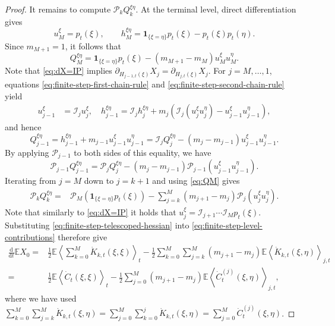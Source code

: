 \documentclass[11pt]{article}
\numberwithin{equation}{section}
\newcommand{\E}{\mathbb{E}}
\newcommand{\1}{\mathbf 1}
\begin{document}
\begin{proof}
It remains to compute $\mathcal P_kQ_k^{\xi\eta}$.  At the terminal
level, direct differentiation gives
\[
u_M^\xi=p_t(\xi),\qquad
h_M^{\xi\eta}
=\mathbf 1_{\{\xi=\eta\}}p_t(\xi)-p_t(\xi)p_t(\eta).
\]
Since $m_{M+1}=1$, it follows that
\begin{equation}\label{eq:QM}
Q_M^{\xi\eta}
=\mathbf 1_{\{\xi=\eta\}}p_t(\xi)
-(m_{M+1}-m_M)u_M^\xi u_M^\eta.
\end{equation}
Note that \eqref{eq:dX=IP} implies $\partial_{H_{j-1,t}(\xi)}X_j = \partial_{H_{j,t}(\xi)}X_j$.
For $j=M,\ldots,1$, equations
\eqref{eq:finite-step-first-chain-rule} and
\eqref{eq:finite-step-second-chain-rule} yield
\begin{align*}
u_{j-1}^\xi
&=\mathcal I_ju_j^\xi, \quad 
h_{j-1}^{\xi\eta}
=\mathcal I_jh_j^{\xi\eta}
+m_j\left(
\mathcal I_j(u_j^\xi u_j^\eta)
-u_{j-1}^\xi u_{j-1}^\eta
\right),
\end{align*}
and hence
\[
Q_{j-1}^{\xi\eta}=h_{j-1}^{\xi\eta}+m_{j-1}u_{j-1}^\xi u_{j-1}^\eta
=\mathcal I_jQ_j^{\xi\eta}
-(m_j-m_{j-1})u_{j-1}^\xi u_{j-1}^\eta.
\]
By applying $\mathcal P_{j-1}$ to both sides of this equality, we have
\[
\mathcal P_{j-1}Q_{j-1}^{\xi\eta}
=\mathcal P_jQ_j^{\xi\eta}
-(m_j-m_{j-1})
\mathcal P_{j-1}(u_{j-1}^\xi u_{j-1}^\eta).
\]
Iterating from $j=M$ down to $j=k+1$ and using \eqref{eq:QM}
gives
\begin{align}
\mathcal P_kQ_k^{\xi\eta}
={}&\mathcal P_M
\left(\mathbf 1_{\{\xi=\eta\}}p_t(\xi)\right)
-\sum_{j=k}^M(m_{j+1}-m_j)
\mathcal P_j(u_j^\xi u_j^\eta).
\label{eq:finite-step-telescoped-hessian}
\end{align}
Note that similarly to \eqref{eq:dX=IP} it holds that $u_j^\xi =\mathcal I_{j+1}\cdots\mathcal I_Mp_t(\xi)$.
Substituting \eqref{eq:finite-step-telescoped-hessian} into
\eqref{eq:finite-step-level-contributions} therefore give
\begin{align*}
   \frac{\mathrm d}{\mathrm dt}\E X_0 
={}&\frac12\E\left\langle
\sum_{k=0}^M\dot K_{k,t}(\xi,\xi)
\right\rangle_t-\frac12\sum_{k=0}^M\sum_{j=k}^M(m_{j+1}-m_j)
\E\left\langle
\dot K_{k,t}(\xi,\eta)
\right\rangle_{j,t}\\
={}&\frac12\E\left\langle
\dot C_t(\xi,\xi)
\right\rangle_t
-\frac12\sum_{j=0}^M(m_{j+1}-m_j)
\E\left\langle
\dot C_t^{(j)}(\xi,\eta)
\right\rangle_{j,t},
\end{align*}
where we have used $\sum_{k=0}^M\sum_{j=k}^M\dot K_{k,t}(\xi,\eta)=\sum_{j=0}^M\sum_{k=0}^j \dot K_{k,t}(\xi,\eta)=\sum_{j=0}^M \dot C_t^{(j)}(\xi,\eta)$.
\end{proof}
\end{document}
